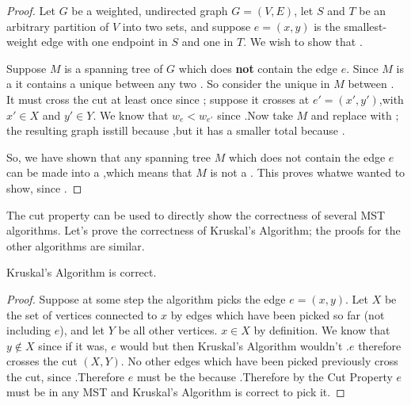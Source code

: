 \documentclass{tufte-handout}
\begin{document}
\begin{proof}
  Let $G$ be a weighted, undirected graph $G = (V,E)$, let $S$ and $T$
  be an arbitrary partition of $V$ into two sets, and suppose
  $e = (x,y)$ is the smallest-weight edge with one endpoint in $S$ and
  one in $T$.  We wish to show that \blank.

  Suppose $M$ is a spanning tree of $G$ which does \textbf{not}
  contain the edge $e$.  Since $M$ is a \blank it contains a unique
  \blank\linebreak between any two \blank. So consider the unique
  \blank\linebreak in $M$ between \blank.   It must cross
  the cut at least once since\linebreak \mbox{} \blank; suppose it
  crosses at $e' = (x',y')$,\linebreak with $x' \in X$ and $y' \in Y$.
  We know that $w_e < w_{e'}$ since \blank.\linebreak Now take $M$ and
  replace \blank with \blank; the resulting graph is\linebreak still
  \blank because \blank,\linebreak but it has a smaller total \blank
  because \blank.

  So, we have shown that any spanning tree $M$ which does not contain
  the edge $e$ can be made into a \blank,\linebreak which means that
  $M$ is not a \blank. This proves what\linebreak we wanted to show, since
  \blank.
\end{proof}

The cut property can be used to directly show the correctness of
several MST algorithms.  Let's prove the correctness of Kruskal's
Algorithm; the proofs for the other algorithms are similar.

\begin{thm}
  Kruskal's Algorithm is correct.
\end{thm}

\begin{proof}
  Suppose at some step the algorithm picks the edge $e = (x,y)$.  Let
  $X$ be the set of vertices connected to $x$ by edges which have been
  picked so far (not including $e$), and let $Y$ be all other
  vertices. $x \in X$ by definition.  We know that $y \notin X$ since
  if it was, $e$ would \blank\linebreak but then Kruskal's Algorithm
  wouldn't \blank.\linebreak $e$ therefore crosses the cut $(X,Y)$. No
  other edges which have been picked previously cross the cut, since
  \blank.\linebreak Therefore $e$ must be the \blank\linebreak because
  \blank.\linebreak Therefore by the Cut Property $e$ must
  be in any MST and Kruskal's Algorithm is correct to pick it.
\end{proof}
\end{document}
